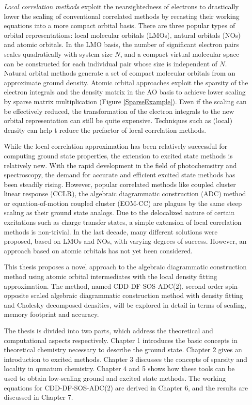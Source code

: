 \emph{Local correlation methods} exploit the nearsightedness of electrons to drastically lower the scaling of conventional correlated methods by recasting their working equations into a more compact orbital basis. There are three popular types of orbital representations: local molecular orbitals (LMOs), natural orbitals (NOs) and atomic orbitals. In the LMO basis, the number of significant electron pairs scales quadratically with system size $N$, and a compact virtual molecular space can be constructed for each individual pair whose size is independent of $N$. Natural orbital methods generate a set of compact molecular orbitals from an approximate ground density. Atomic orbital approaches exploit the sparsity of the electron integrals and the density matrix in the AO basis to achieve lower scaling by sparse matrix multiplication (Figure \ref{SparseExample}). Even if the scaling can be effectively reduced, the transformation of the electron integrals to the new orbital representation can still be quite expensive. Techniques such as (local) density can help t reduce the prefactor of local correlation methods.

While the local correlation approximation has been relatively successful for computing ground state properties, the extension to excited state methods is relatively new. With the rapid development in the field of photochemsitry and spectroscopy, the demand for accurate and efficient excited state methods has been steadily rising. However, popular correlated methods like coupled cluster linear response (CCLR), the algebraic diagrammatic construction (ADC) method or equation-of-motion coupled cluster (EOM-CC) are plagues by the same steep scaling as their ground state analogs. Due to the delocalized nature of certain excitations such as charge transfer states, a simple extension of local correlation methods is non-trivial. In the last decade, many different solutions were proposed, based on LMOs and NOs, with varying degrees of success. However, an approach based on atomic orbitals has not yet been considered.

This thesis proposes a novel approach to the algebraic diagrammatic construction method using atomic orbital intermediates with the local density fitting approximation. The method, named CDD-DF-SOS-ADC(2), second order spin-opposite scaled  algebraic diagrammatic construction method with density fitting and Cholesky decomposed densities, will be explored in detail in terms of scaling, memory footprint and accuracy.

The thesis is divided into two parts, which address the theoretical and computational aspects respectively. Chapter 1 introduces the basic concepts in theoretical chemistry necessary to describe the ground state. Chapter 2 gives an introduction to excited methods. Chapter 3 discusses the concepts of sparsity and locality in qunatum chemistry. Chapter 4 and 5 shows how these tools can be used to obtain low-scaling ground and excited state methods. The working equations for CDD-DF-SOS-ADC(2) are derived in Chapter 6, and the results are discussed in Chapter 7.

